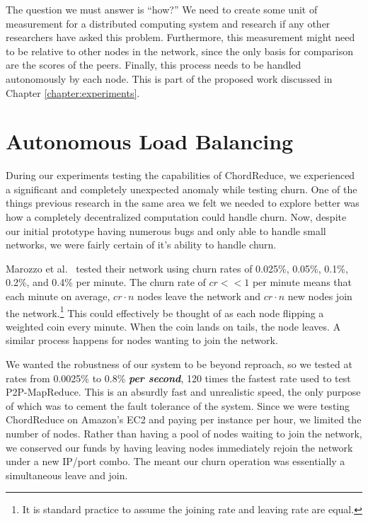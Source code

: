 The question we must answer is ``how?''
We need to create some unit of measurement for a distributed computing system and research if any other researchers have asked this problem.
Furthermore, this measurement might need to be relative to other nodes in the network, since the only basis for comparison are the scores of the peers. 
Finally, this process needs to be handled autonomously by each node.
This is part of the proposed work discussed in Chapter \ref{chapter:experiments}.
\section{Autonomous Load Balancing}
\label{sec:auto-load-bal}


During our experiments testing the capabilities of ChordReduce, we experienced a significant and completely unexpected anomaly while testing churn.
One of the things previous research \cite{marozzo2012p2p}  \cite{leemap} in the same area we felt we needed to explore better was how a completely decentralized computation could handle churn.
Now, despite our initial prototype having numerous bugs and only able to handle small networks, we were fairly certain of it's ability to handle churn.

Marozzo et al.\ \cite{marozzo2012p2p} tested their network using churn rates of 0.025\%, 0.05\%, 0.1\%, 0.2\%, and 0.4\% per minute.
The churn rate of $cr << 1$ per minute means that each minute on average, $cr \cdot n$ nodes leave the network and $cr \cdot n$  new nodes join the network.\footnote{It is standard practice to assume the joining rate and leaving rate are equal.}
This could effectively be thought of as each node flipping a weighted coin every minute.
When the coin lands on tails, the node leaves.
A similar process happens for nodes wanting to join the network.

We wanted the robustness of our system to be beyond reproach, so we tested at rates from 0.0025\% to 0.8\% \textbf{\textit{per second}}, 120 times the fastest rate used to test P2P-MapReduce.
This is an absurdly fast and unrealistic speed, the only purpose of which was to cement the fault tolerance of the system.
Since we were testing ChordReduce on Amazon's EC2 and paying per instance per hour, we limited the number of nodes.
Rather than having a pool of nodes waiting to join the network, we conserved our funds by having leaving nodes immediately rejoin the network under a new IP/port combo.
The meant our churn operation was essentially a simultaneous leave and join.


